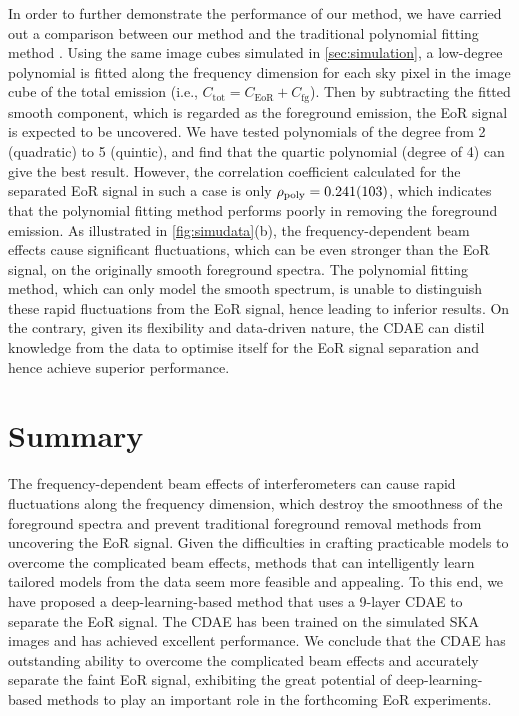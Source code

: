 \documentclass[letters,fleqn,usenatbib]{mnras}
\newcommand{\R}[1]{\mathrm{#1}}
\begin{document}
In order to further demonstrate the performance of our method, we have
carried out a comparison between our method and the traditional polynomial
fitting method \citep[e.g.,][]{wang2006,liu2009ps}.
Using the same image cubes simulated in \autoref{sec:simulation},
a low-degree polynomial is fitted along the frequency dimension for each
sky pixel in the image cube of the total emission (i.e.,
$C_{\R{tot}} = C_{\R{EoR}} + C_{\R{fg}}$).
Then by subtracting the fitted smooth component, which is regarded as
the foreground emission, the EoR signal is expected to be uncovered.
We have tested polynomials of the degree from 2 (quadratic) to
5 (quintic), and find that the quartic polynomial (degree of 4)
can give the best result.
However, the correlation coefficient calculated for the separated EoR
signal in such a case is only $\rho_{\R{poly}} = \num{0.241 +- 0.103}$,
which indicates that the polynomial fitting method
performs poorly in removing the foreground emission.
As illustrated in \autoref{fig:simudata}(b), the frequency-dependent
beam effects cause significant fluctuations, which can be even stronger
than the EoR signal, on the originally smooth foreground spectra.
The polynomial fitting method, which can only model the smooth
spectrum, is unable to distinguish these rapid fluctuations from the
EoR signal, hence leading to inferior results.
On the contrary, given its flexibility and data-driven nature,
the CDAE can distil knowledge from the data to optimise itself for
the EoR signal separation and hence achieve superior performance.


\section{Summary}
\label{sec:summary}

The frequency-dependent beam effects of interferometers can cause
rapid fluctuations along the frequency dimension,
which destroy the smoothness of the foreground spectra and prevent
traditional foreground removal methods from uncovering the EoR signal.
Given the difficulties in crafting practicable models to overcome the
complicated beam effects, methods that can intelligently learn tailored
models from the data seem more feasible and appealing.
To this end, we have proposed a deep-learning-based method that uses
a 9-layer CDAE to separate the EoR signal.
The CDAE has been trained on the simulated SKA images and has achieved
excellent performance.
We conclude that the CDAE has outstanding ability to overcome the
complicated beam effects and accurately separate the faint EoR signal,
exhibiting the great potential of deep-learning-based methods
to play an important role in the forthcoming EoR experiments.
\end{document}
